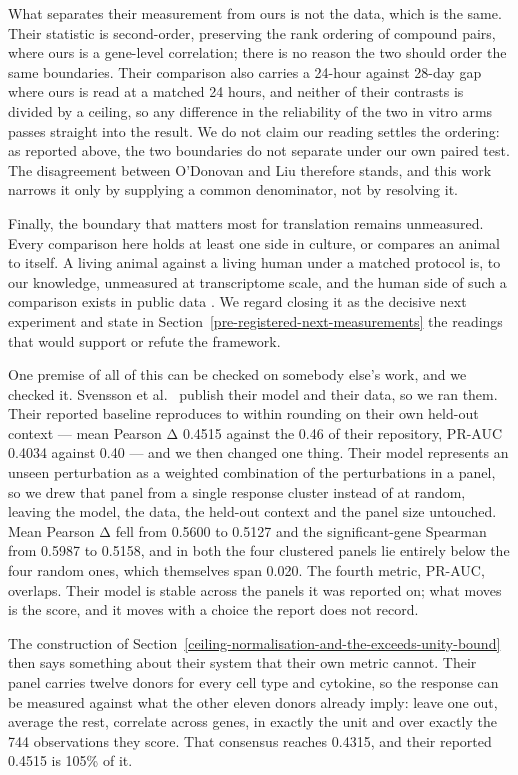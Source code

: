 \documentclass[11pt,a4paper]{article}
\begin{document}
What separates their measurement from ours is not the data, which is the
same. Their statistic is second-order, preserving the rank ordering of
compound pairs, where ours is a gene-level correlation; there is no
reason the two should order the same boundaries. Their comparison also
carries a 24-hour against 28-day gap where ours is read at a matched 24
hours, and neither of their contrasts is divided by a ceiling, so any
difference in the reliability of the two in vitro arms passes straight
into the result. We do not claim our reading settles the ordering: as
reported above, the two boundaries do not separate under our own paired
test. The disagreement between O'Donovan and Liu therefore stands, and
this work narrows it only by supplying a common denominator, not by
resolving it.

Finally, the boundary that matters most for translation remains
unmeasured. Every comparison here holds at least one side in culture, or
compares an animal to itself. A living animal against a living human
under a matched protocol is, to our knowledge, unmeasured at
transcriptome scale, and the human side of such a comparison exists in
public data \cite{ref15,ref16,ref17,ref28}. We regard closing it as the decisive next
experiment and state in Section~\ref{pre-registered-next-measurements} the readings that would support or
refute the framework.

One premise of all of this can be checked on somebody else's work, and
we checked it. Svensson et al.~\cite{ref62} publish their model and their
data, so we ran them. Their reported baseline reproduces to within
rounding on their own held-out context --- mean Pearson Δ 0.4515 against
the 0.46 of their repository, PR-AUC 0.4034 against 0.40 --- and we then
changed one thing. Their model represents an unseen perturbation as a
weighted combination of the perturbations in a panel, so we drew that
panel from a single response cluster instead of at random, leaving the
model, the data, the held-out context and the panel size untouched. Mean
Pearson Δ fell from 0.5600 to 0.5127 and the significant-gene Spearman
from 0.5987 to 0.5158, and in both the four clustered panels lie
entirely below the four random ones, which themselves span 0.020. The
fourth metric, PR-AUC, overlaps. Their model is stable across the panels
it was reported on; what moves is the score, and it moves with a choice
the report does not record.

The construction of Section~\ref{ceiling-normalisation-and-the-exceeds-unity-bound} then says something about their system
that their own metric cannot. Their panel carries twelve donors for
every cell type and cytokine, so the response can be measured against
what the other eleven donors already imply: leave one out, average the
rest, correlate across genes, in exactly the unit and over exactly the
744 observations they score. That consensus reaches 0.4315, and their
reported 0.4515 is 105\% of it.
\end{document}
